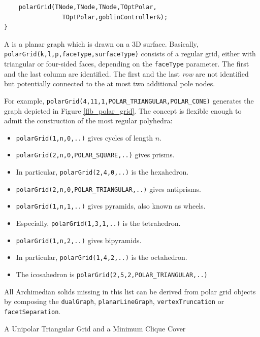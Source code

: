 \documentclass[a4paper,11pt,twoside]{book}
\begin{document}
\begin{multicols}{2}
\begin{mymethods}
\begin{verbatim}
    polarGrid(TNode,TNode,TNode,TOptPolar,
                TOptPolar,goblinController&);
}
\end{verbatim}
\end{mymethods}
A  is a planar graph which is drawn on a 3D surface. Basically,
\verb/polarGrid(k,l,p,faceType,surfaceType)/ consists of a regular grid, either
with triangular or four-sided faces, depending on the \verb/faceType/ parameter.
The first and the last column are identified. The first and the last {\it row}
are not identified but potentially connected to the at most two additional pole
nodes.

For example, \verb/polarGrid(4,11,1,POLAR_TRIANGULAR,POLAR_CONE)/ generates the
graph depicted in Figure \ref{flb_polar_grid}. The concept is flexible enough to
admit the construction of the most regular polyhedra:
\begin{itemize}
\item \verb/polarGrid(1,n,0,..)/ gives cycles of length $n$.
\item \verb/polarGrid(2,n,0,POLAR_SQUARE,..)/ gives prisms.
\item In particular, \verb/polarGrid(2,4,0,..)/ is the hexahedron.
\item \verb/polarGrid(2,n,0,POLAR_TRIANGULAR,..)/ gives antiprisms.
\item \verb/polarGrid(1,n,1,..)/ gives pyramids, also known as wheels.
\item Especially, \verb/polarGrid(1,3,1,..)/ is the tetrahedron.
\item \verb/polarGrid(1,n,2,..)/ gives bipyramids.
\item In particular, \verb/polarGrid(1,4,2,..)/ is the octahedron.
\item The icosahedron is \verb/polarGrid(2,5,2,POLAR_TRIANGULAR,..)/
\end{itemize}
All Archimedian solids missing in this list can be derived from polar grid objects
by composing the \verb/dualGraph/, \verb/planarLineGraph/, \verb/vertexTruncation/
or \verb/facetSeparation/.

\bigskip
\begin{figurehere}
\begin{center}
\epsfxsize=8cm
\vspace{0.5cm}
\caption{\label{flb_polar_grid}A Unipolar Triangular Grid and a Minimum Clique Cover}
\end{center}
\end{figurehere}



\end{multicols}
\end{document}
